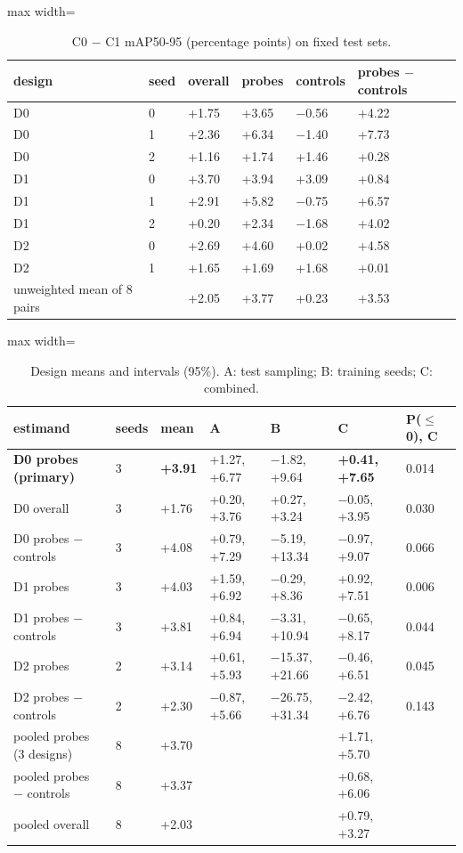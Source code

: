 \documentclass[11pt]{article}
\begin{document}
\begin{table}[htbp]\centering\small
\caption{C0 $-$ C1 mAP50-95 (percentage points) on fixed test sets.}
\begin{adjustbox}{max width=\linewidth}
\begin{tabular}{llllll}
\toprule
design & seed & overall & probes & controls & probes $-$ controls \\ \midrule
D0 & 0 & +1.75 & +3.65 & $-$0.56 & +4.22 \\
D0 & 1 & +2.36 & +6.34 & $-$1.40 & +7.73 \\
D0 & 2 & +1.16 & +1.74 & +1.46 & +0.28 \\
D1 & 0 & +3.70 & +3.94 & +3.09 & +0.84 \\
D1 & 1 & +2.91 & +5.82 & $-$0.75 & +6.57 \\
D1 & 2 & +0.20 & +2.34 & $-$1.68 & +4.02 \\
D2 & 0 & +2.69 & +4.60 & +0.02 & +4.58 \\
D2 & 1 & +1.65 & +1.69 & +1.68 & +0.01 \\
unweighted mean of 8 pairs &  & +2.05 & +3.77 & +0.23 & +3.53 \\
\bottomrule
\end{tabular}
\end{adjustbox}
\end{table}
\begin{table}[htbp]\centering\small
\caption{Design means and intervals (95\%). A: test sampling; B: training seeds; C: combined.}
\begin{adjustbox}{max width=\linewidth}
\begin{tabular}{lllllll}
\toprule
estimand & seeds & mean & A & B & C & P($\leq$0), C \\ \midrule
\textbf{D0 probes (primary)} & 3 & \textbf{+3.91} & +1.27, +6.77 & $-$1.82, +9.64 & \textbf{+0.41, +7.65} & 0.014 \\
D0 overall & 3 & +1.76 & +0.20, +3.76 & +0.27, +3.24 & $-$0.05, +3.95 & 0.030 \\
D0 probes $-$ controls & 3 & +4.08 & +0.79, +7.29 & $-$5.19, +13.34 & $-$0.97, +9.07 & 0.066 \\
D1 probes & 3 & +4.03 & +1.59, +6.92 & $-$0.29, +8.36 & +0.92, +7.51 & 0.006 \\
D1 probes $-$ controls & 3 & +3.81 & +0.84, +6.94 & $-$3.31, +10.94 & $-$0.65, +8.17 & 0.044 \\
D2 probes & 2 & +3.14 & +0.61, +5.93 & $-$15.37, +21.66 & $-$0.46, +6.51 & 0.045 \\
D2 probes $-$ controls & 2 & +2.30 & $-$0.87, +5.66 & $-$26.75, +31.34 & $-$2.42, +6.76 & 0.143 \\
pooled probes (3 designs) & 8 & +3.70 &  &  & +1.71, +5.70 &  \\
pooled probes $-$ controls & 8 & +3.37 &  &  & +0.68, +6.06 &  \\
pooled overall & 8 & +2.03 &  &  & +0.79, +3.27 &  \\
\bottomrule
\end{tabular}
\end{adjustbox}
\end{table}
\end{document}
